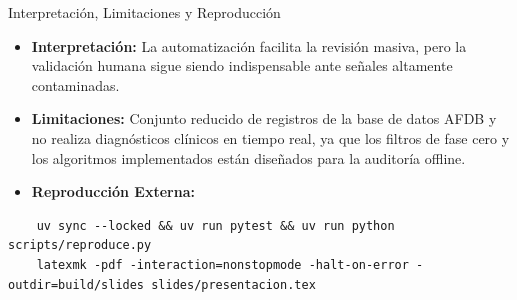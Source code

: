 \documentclass[aspectratio=169]{beamer}
\begin{document}
\begin{frame}[fragile]{Interpretación, Limitaciones y Reproducción}
    \begin{itemize}
        \small
        \item \textbf{Interpretación:} La automatización facilita la revisión masiva, pero la validación humana sigue siendo indispensable ante señales altamente contaminadas.
        \item \textbf{Limitaciones:} Conjunto reducido de registros de la base de datos AFDB y no realiza diagnósticos clínicos en tiempo real, ya que los filtros de fase cero y los algoritmos implementados están diseñados para la auditoría offline.
        \item \textbf{Reproducción Externa:}
    \end{itemize}
    \vspace{-0.1cm}
    \tiny
    \begin{verbatim}
    uv sync --locked && uv run pytest && uv run python scripts/reproduce.py
    latexmk -pdf -interaction=nonstopmode -halt-on-error -outdir=build/slides slides/presentacion.tex
    \end{verbatim}
\end{frame}
\end{document}
